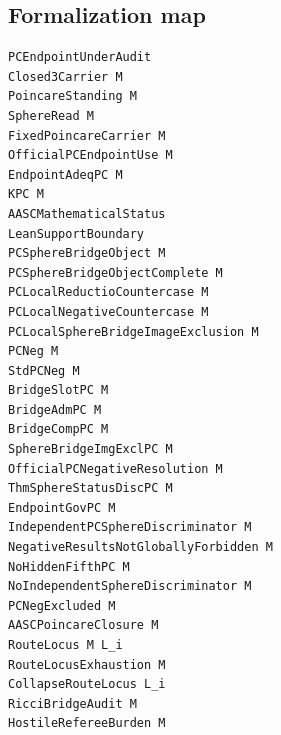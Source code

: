 \documentclass[11pt]{article}
\begin{document}
\subsection*{Formalization map}
{}
\begin{verbatim}
PCEndpointUnderAudit
Closed3Carrier M
PoincareStanding M
SphereRead M
FixedPoincareCarrier M
OfficialPCEndpointUse M
EndpointAdeqPC M
KPC M
AASCMathematicalStatus
LeanSupportBoundary
PCSphereBridgeObject M
PCSphereBridgeObjectComplete M
PCLocalReductioCountercase M
PCLocalNegativeCountercase M
PCLocalSphereBridgeImageExclusion M
PCNeg M
StdPCNeg M
BridgeSlotPC M
BridgeAdmPC M
BridgeCompPC M
SphereBridgeImgExclPC M
OfficialPCNegativeResolution M
ThmSphereStatusDiscPC M
EndpointGovPC M
IndependentPCSphereDiscriminator M
NegativeResultsNotGloballyForbidden M
NoHiddenFifthPC M
NoIndependentSphereDiscriminator M
PCNegExcluded M
AASCPoincareClosure M
RouteLocus M L_i
RouteLocusExhaustion M
CollapseRouteLocus L_i
RicciBridgeAudit M
HostileRefereeBurden M
\end{verbatim}
\end{document}
